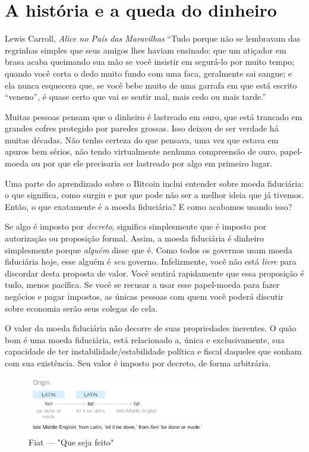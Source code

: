 \chapter{A história e a queda do dinheiro}
\label{les:12}

\begin{chapquote}{Lewis Carroll, \textit{Alice no País das Maravilhas}}
\enquote{Tudo porque não se lembravam das regrinhas simples que seus amigos lhes haviam ensinado: que um atiçador em brasa acaba queimando sua mão se você insistir em segurá-lo por muito tempo; quando você corta o dedo muito fundo com uma faca, geralmente sai sangue; e ela nunca esquecera que, se você bebe muito de uma garrafa em que está escrito “veneno”, é quase certo que vai se sentir mal, mais cedo ou mais tarde.}
\end{chapquote}

Muitas pessoas pensam que o dinheiro é lastreado em ouro, que está trancado em grandes cofres protegido por paredes grossas. Isso deixou de ser verdade há muitas décadas. Não tenho certeza do que pensava, uma vez que estava em apuros bem sérios, não tendo virtualmente nenhuma compreensão de ouro, papel-moeda ou por que ele precisaria ser lastreado por algo em primeiro lugar.

Uma parte do aprendizado sobre o Bitcoin inclui entender sobre moeda fiduciária: o que significa, como surgiu e por que pode não ser a melhor ideia que já tivemos. Então, o que exatamente é a moeda fiduciária? E como acabamos usando isso?

Se algo é imposto por \textit{decreto}, significa simplesmente que é imposto por autorização ou proposição formal. Assim, a moeda fiduciária é dinheiro simplesmente porque \textit{alguém} disse que é. Como todos os governos usam moeda fiduciária hoje, esse alguém é \textit{seu} governo. Infelizmente, você não está \textit{livre} para discordar desta proposta de valor. Você sentirá rapidamente que essa proposição é tudo, menos pacífica. Se você se recusar a usar esse papel-moeda para fazer negócios e pagar impostos, as únicas pessoas com quem você poderá discutir sobre economia serão seus colegas de cela.

O valor da moeda fiduciária não decorre de suas propriedades inerentes. O quão bom é uma moeda fiduciária, está relacionado a, única e exclusivamente, sua capacidade de ter instabilidade/estabilidade política e fiscal daqueles que sonham com sua existência. Seu valor é imposto por decreto, de forma arbitrária.

\begin{figure}
  \centering
  \includegraphics[width=8cm]{assets/images/fiat-definition.png}
  \caption{Fiat --- "Que seja feito"}
  \label{fig:fiat-definition}
\end{figure}

